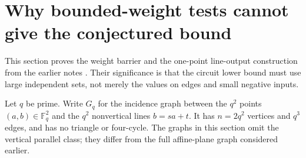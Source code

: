\section{Why bounded-weight tests cannot give the conjectured bound}
This section proves the weight barrier and the one-point line-output construction from the earlier notes \citep[Theorem~C, Section~3.3; Theorem~D, Section~1.2]{FableNotes}. Their significance is that the circuit lower bound must use large independent sets, not merely the values on edges and small negative inputs.

Let $q$ be prime. Write $G_q$ for the incidence graph between the $q^2$ points $(a,b)\in\mathbb F_q^2$ and the $q^2$ nonvertical lines $b=sa+t$. It has $n=2q^2$ vertices and $q^3$ edges, and has no triangle or four-cycle. The graphs in this section omit the vertical parallel class; they differ from the full affine-plane graph considered earlier.

